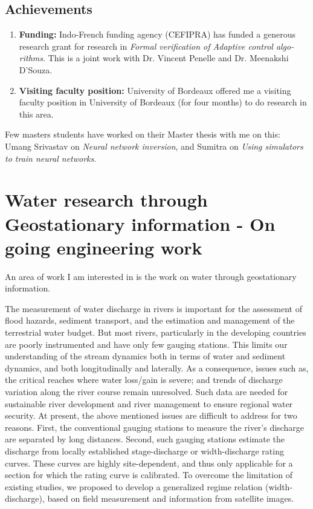 \documentclass[a4paper,10pt]{article}
\theoremstyle{open}
\begin{document}
\subsection{Achievements}
\begin{enumerate}
 \item \textbf{Funding:} Indo-French funding agency (CEFIPRA) has funded a generous research grant for research in \emph{Formal verification of Adaptive control algo-
rithms}. This is a joint work with Dr. Vincent Penelle and Dr. Meenakshi D'Souza.
 \item \textbf{Visiting faculty position:} University of Bordeaux offered me a visiting faculty position in University of Bordeaux (for four months) to do research in this area.
\end{enumerate}
Few masters students have worked on their Master thesis with me on this: Umang Srivastav on \emph{Neural network inversion}, and Sumitra on \emph{Using simulators to train neural networks}.

\section{Water research through Geostationary information - On going engineering work}
An area of work I am interested in is the work on water through geostationary information.

The measurement of water discharge in rivers is important for the assessment of flood hazards, sediment transport, and the estimation and management of the terrestrial water budget. But most rivers, particularly in the developing countries are poorly instrumented and have only few gauging stations. This limits our understanding of the stream dynamics both in terms of water and sediment dynamics, and both longitudinally and laterally. As a consequence, issues such as, the critical reaches where water loss/gain is severe; and trends of discharge variation along the river course remain unresolved. Such data are needed for sustainable river development and river management to ensure regional water security.
At present, the above mentioned issues are difficult to address for two reasons.  First, the conventional gauging stations to measure the river’s discharge are separated by long distances. Second, such gauging stations estimate the discharge from locally established stage-discharge or width-discharge rating curves. These curves are highly site-dependent, and thus only applicable for a section for which the rating curve is calibrated.
To overcome the limitation of existing studies, we proposed to develop a generalized regime relation (width-discharge), based on field measurement and information from satellite images.
\end{document}
